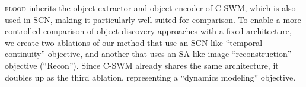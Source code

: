 \documentclass{article}
\newcommand{\jd}[1]{\textcolor{orange}{[DJ: #1]}}
\begin{document}
\textsc{flood} inherits the object extractor and object encoder of C-SWM, which is also used in SCN, making it particularly well-suited for comparison. To enable a more controlled comparison of object discovery approaches with a fixed architecture, we create two ablations of our method that use an SCN-like ``temporal continuity'' objective, and another that uses an SA-like image ``reconstruction'' objective (``Recon''). Since C-SWM already shares the same architecture, it doubles up as the third ablation, representing a ``dynamics modeling'' objective. %


\end{document}
